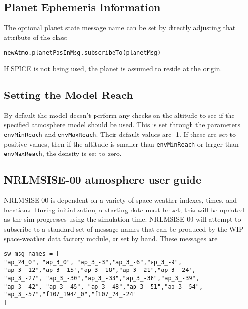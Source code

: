\subsection{Planet Ephemeris Information}
The optional planet state message name can be set by directly adjusting that attribute of the class:
\begin{verbatim}
newAtmo.planetPosInMsg.subscribeTo(planetMsg)
\end{verbatim}
If SPICE is not being used, the planet is assumed to reside at the origin.

\subsection{Setting the Model Reach}
By default the model doesn't perform any checks on the altitude to see if the specified atmosphere model should be used.  This is set through the parameters {\tt envMinReach} and {\tt envMaxReach}.  Their default values are -1.  If these are set to positive values, then if the altitude is smaller than {\tt envMinReach} or larger than {\tt envMaxReach}, the density is set to zero.


\subsection{NRLMSISE-00 atmosphere user guide}
NRLMSISE-00 is dependent on a variety of space weather indexes, times, and locations. During initialization, a starting date must be set; this will be updated as the sim progresses using the simulation time. NRLMSISE-00 will attempt to subscribe to a standard set of message names that can be produced by the WIP space-weather data factory module, or set by hand. These messages are
\begin{verbatim}
sw_msg_names = [
"ap_24_0", "ap_3_0", "ap_3_-3","ap_3_-6","ap_3_-9",
"ap_3_-12","ap_3_-15","ap_3_-18","ap_3_-21","ap_3_-24",
"ap_3_-27", "ap_3_-30","ap_3_-33","ap_3_-36","ap_3_-39",
"ap_3_-42", "ap_3_-45", "ap_3_-48","ap_3_-51","ap_3_-54",
"ap_3_-57","f107_1944_0","f107_24_-24"
]
\end{verbatim}